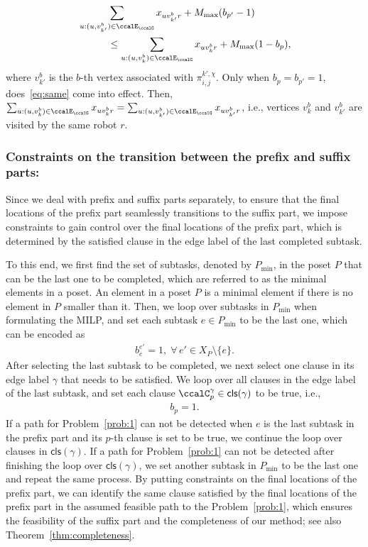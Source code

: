 \documentclass[Afour,sageh,times]{sagej}
\newcommand{\clause}[1]{\mathsf{cls}(#1)}
\newcommand{\aap}[4]{\mathcal{\pi}_{{#1},{#2}}^{#3,#4}}
\begin{document}
{{{{{\begin{subequations}
\begin{align}
    & \sum_{u:(u, v_{k'}^b) \in \ccalE_\ccalG} x_{u v_{k'}^b r} + M_{\text{max}} (b_{p'} - 1) \nonumber \\& \quad\quad\quad \leq \sum_{u:(u, v_{k}^b) \in \ccalE_\ccalG} x_{u v_{k}^b r} + M_{\text{max}}(1 - b_{p}),
  \end{align}
\end{subequations}
\endgroup
where $v_{k'}^b$ is the $b$-th vertex associated with $\aap{i}{j}{k'}{\chi}$. Only when $b_p = b_{p'}=1$, does~\eqref{eq:same} come into effect. Then, $\sum\nolimits_{u:(u, v_k^b) \in \ccalE_\ccalG} x_{u v_k^b r} = \sum\nolimits_{u:(u, v_{k'}^b) \in \ccalE_\ccalG} x_{u v_{k'}^b r} $, i.e., vertices $v_k^b$ and $v_{k'}^b$ are visited by the same robot $r$.

\subsubsection{Constraints on the transition between the prefix and suffix parts:}\label{sec:transition} Since we deal with prefix and suffix parts separately, to ensure that the final locations of the prefix part seamlessly transitions to the suffix part, we impose constraints to gain control over  the final locations of the prefix part, which is determined by the satisfied clause in the edge label of the last completed subtask.

To this end,  we first find the set of subtasks, denoted by $P_{\text{min}}$, in the poset $P$ that can be the last one to be completed, which are referred to as the minimal elements in a poset. An element in a poset $P$  is a minimal element if there is no element in $P$ smaller than it. Then, we loop over subtasks in $P_{\text{min}}$ when formulating the MILP, and set each subtask $e\in P_{\text{min}}$ to be the last one, which can be encoded as
\begin{align}\label{eq:lastsubtask0}
  b_e^{e'} = 1, \;  \forall\, e' \in X_P \setminus\{e\}.
\end{align}
After selecting the last subtask to be completed, we next select one clause in its edge label $\gamma$ that needs to be satisfied. We loop over all clauses in the edge label of the last subtask, and set each clause $\ccalC_p^\gamma \in \clause{\gamma}$ to be true, i.e.,
\begin{align}\label{eq:lastclause}
  b_p = 1.
\end{align}
If a path for Problem~\ref{prob:1} can not be detected when  $e$ is the last subtask in the prefix part  and its $p$-th clause is set to be true,  we continue the loop over clauses in $\clause{\gamma}$. If a path for Problem~\ref{prob:1} can not be detected after finishing the loop over $\clause{\gamma}$, we set another subtask in $P_{\text{min}}$ to be the last one and repeat the same process. By putting constraints on the final locations of the prefix part, we can identify the same clause satisfied by the final locations of the prefix part in the assumed feasible path to the Problem~\ref{prob:1}, which ensures the feasibility of  the suffix part and the completeness of our method; see also Theorem~\ref{thm:completeness}.


}}}}}
\end{document}

